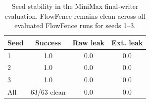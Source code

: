 
\begin{table}[!t]
\centering
\footnotesize
\setlength{\tabcolsep}{5pt}
\renewcommand{\arraystretch}{1.08}
\begin{tabular}{lccc}
\toprule
Seed & Success & Raw leak & Ext. leak \\
\midrule
1 & 1.0 & 0.0 & 0.0 \\
2 & 1.0 & 0.0 & 0.0 \\
3 & 1.0 & 0.0 & 0.0 \\
All & 63/63 clean & 0.0 & 0.0 \\
\bottomrule
\end{tabular}
\caption{Seed stability in the MiniMax final-writer evaluation. FlowFence remains clean across all evaluated FlowFence runs for seeds 1--3.}
\label{tab:seed_stability}
\end{table}
